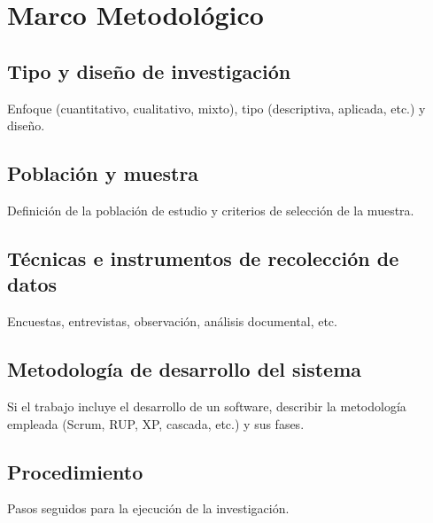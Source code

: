 \chapter{Marco Metodológico}
\label{cap:metodologia}

\section{Tipo y diseño de investigación}

Enfoque (cuantitativo, cualitativo, mixto), tipo (descriptiva, aplicada, etc.)
y diseño.

\section{Población y muestra}

Definición de la población de estudio y criterios de selección de la muestra.

\section{Técnicas e instrumentos de recolección de datos}

Encuestas, entrevistas, observación, análisis documental, etc.

\section{Metodología de desarrollo del sistema}

Si el trabajo incluye el desarrollo de un software, describir la metodología
empleada (Scrum, RUP, XP, cascada, etc.) y sus fases.

\section{Procedimiento}

Pasos seguidos para la ejecución de la investigación.
